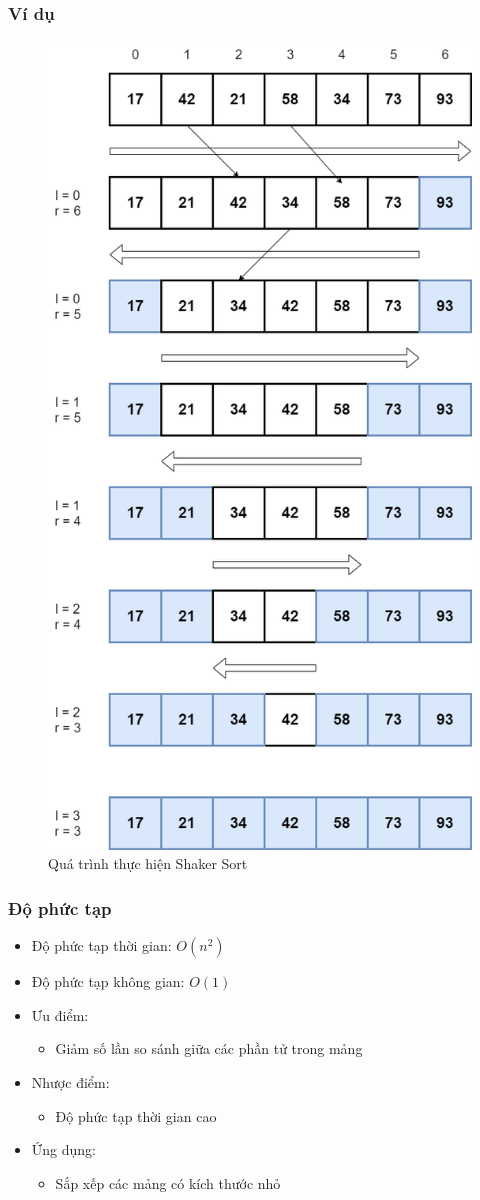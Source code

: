\subsubsection{Ví dụ}
\begin{figure}[H]
    \centering
    \includegraphics[width=0.6\linewidth]{img/shaker_sort/1.png}
    \caption{Quá trình thực hiện Shaker Sort}
\end{figure}

\subsubsection{Độ phức tạp}

\begin{itemize}
    \item Độ phức tạp thời gian: $O(n^2)$
    \item Độ phức tạp không gian: $O(1)$
    \item Ưu điểm:
        \begin{itemize}
            \item Giảm số lần so sánh giữa các phần tử trong mảng
        \end{itemize}
    \item Nhược điểm:
        \begin{itemize}
            \item Độ phức tạp thời gian cao
        \end{itemize}
    \item Ứng dụng:
        \begin{itemize}
            \item Sắp xếp các mảng có kích thước nhỏ
        \end{itemize}
\end{itemize}
